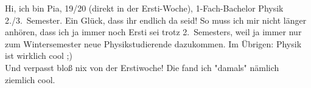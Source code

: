 \begin{multicols*}{2}
{Hi, ich bin Pia, 19/20 (direkt in der Ersti-Woche), 1-Fach-Bachelor Physik 2./3.\ Semester. Ein Glück, dass ihr endlich da seid!
	So muss ich mir nicht länger anhören, dass ich ja immer noch Ersti sei trotz 2.~Semesters, weil ja immer nur zum Wintersemester neue Physikstudierende dazukommen.
	Im Übrigen: Physik ist wirklich cool ;)\\
	Und verpasst bloß nix von der Erstiwoche!
	Die fand ich "damals" nämlich ziemlich cool.}

\vspace{6ex}


\end{multicols*}
